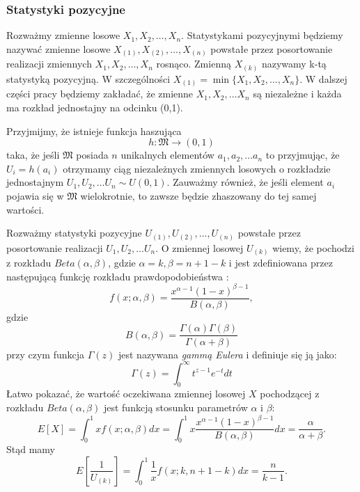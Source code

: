 \subsubsection{Statystyki pozycyjne}

Rozważmy  zmienne losowe $X_1, X_2, \dots, X_n$. Statystykami pozycyjnymi będziemy nazywać zmienne losowe  $X_{(1)}, X_{(2)}, \dots, X_{(n)}$ powstałe przez posortowanie realizacji zmiennych $X_1, X_2, \dots, X_n$ rosnąco.  Zmienną $X_{(k)}$ nazywamy k-tą statystyką pozycyjną. W szczególności $X_{(1)} = \min\{X_1, X_2, \dots, X_n \}$. W dalszej części pracy będziemy zakładać, że
zmienne $X_1, X_2, \dots X_n$ są niezależne i każda  ma rozkład jednostajny na odcinku (0,1).

Przyjmijmy, że istnieje funkcja haszująca 
\begin{equation}
    h \colon \mathfrak{M} \rightarrow (0, 1)
\end{equation}
taka, że jeśli $\mathfrak{M}$ posiada $n$ unikalnych elementów $a_1, a_2, \dots a_n$ to przyjmując, że
 $U_i = h(a_i)$ otrzymamy ciąg niezależnych zmiennych losowych o rozkładzie jednostajnym $U_1, U_2, \dots U_n \sim U(0,1)$. Zauważmy również, że jeśli element $a_i$ pojawia się w  $\mathfrak{M}$ wielokrotnie, to zawsze będzie zhaszowany do tej samej wartości.
 
Rozważmy statystyki pozycyjne  $U_{(1)}, U_{(2)}, \dots, U_{(n)}$ powstałe przez posortowanie realizacji  $U_1, U_2, \dots U_n$. O zmiennej losowej $U_{(k)}$ wiemy, że pochodzi z rozkładu $Beta(\alpha, \beta)$, gdzie $\alpha = k, \beta = n + 1 - k$ i jest zdefiniowana przez następującą funkcję rozkładu prawdopodobieństwa \cite{mincount}:
\begin{equation}
    f(x; \alpha, \beta) = \frac{x^{\alpha-1}{(1-x)}^{\beta-1}}{B(\alpha, \beta)},
\end{equation} 
gdzie $$B(\alpha, \beta) = \frac{\Gamma(\alpha)\Gamma(\beta)}{\Gamma(\alpha + \beta)}$$ przy czym funkcja $\Gamma(z)$ jest nazywana \textit{gammą Eulera} i definiuje się ją jako: $$\Gamma(z) = \int_0^\infty t^{z-1}e^{-t} dt$$
Łatwo pokazać, że wartość oczekiwana zmiennej losowej $X$ pochodzącej z rozkładu $Beta(\alpha, \beta)$ jest funkcją stosunku parametrów $\alpha$ i $\beta$:
\begin{equation}
    E[X] = \int_0^1 xf(x; \alpha, \beta) dx = \int_0^1 x\frac{x^{\alpha-1}{(1-x)}^{\beta-1}}{B(\alpha, \beta)} dx = \frac{\alpha}{\alpha + \beta} .
\end{equation}
Stąd mamy
\begin{equation}
\label{OS-expexcation}
E[\frac{1}{U_{(k)}}] = \int_0^1 \frac{1}{x}f(x; k, n + 1 - k) dx = \frac{n}{k-1}.
\end{equation}
 
